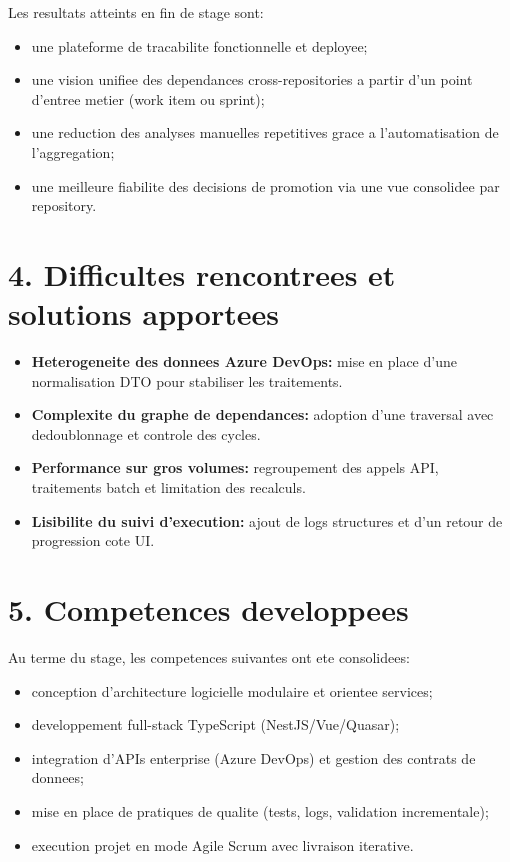 Les resultats atteints en fin de stage sont:

\begin{itemize}
  \item une plateforme de tracabilite fonctionnelle et deployee;
  \item une vision unifiee des dependances cross-repositories a partir d'un
  point d'entree metier (work item ou sprint);
  \item une reduction des analyses manuelles repetitives grace a
  l'automatisation de l'aggregation;
  \item une meilleure fiabilite des decisions de promotion via une vue
  consolidee par repository.
\end{itemize}

\section*{4. Difficultes rencontrees et solutions apportees}

\begin{itemize}
  \item \textbf{Heterogeneite des donnees Azure DevOps:} mise en place d'une
  normalisation DTO pour stabiliser les traitements.
  \item \textbf{Complexite du graphe de dependances:} adoption d'une traversal
  avec dedoublonnage et controle des cycles.
  \item \textbf{Performance sur gros volumes:} regroupement des appels API,
  traitements batch et limitation des recalculs.
  \item \textbf{Lisibilite du suivi d'execution:} ajout de logs structures et
  d'un retour de progression cote UI.
\end{itemize}

\section*{5. Competences developpees}

Au terme du stage, les competences suivantes ont ete consolidees:

\begin{itemize}
  \item conception d'architecture logicielle modulaire et orientee services;
  \item developpement full-stack TypeScript (NestJS/Vue/Quasar);
  \item integration d'APIs enterprise (Azure DevOps) et gestion des contrats de
  donnees;
  \item mise en place de pratiques de qualite (tests, logs, validation
  incrementale);
  \item execution projet en mode Agile Scrum avec livraison iterative.
\end{itemize}

